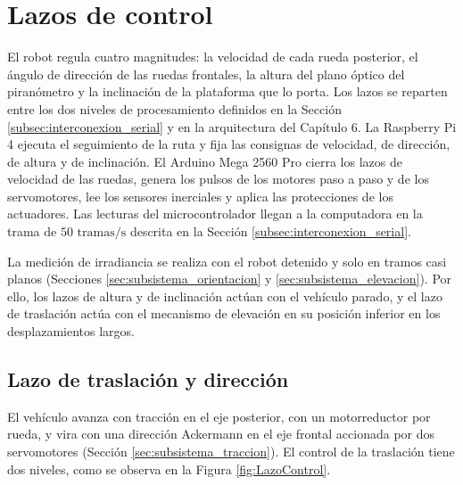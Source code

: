\documentclass[../../General.tex]{subfiles}
\begin{document}

\section{Lazos de control}\label{sec:lazos_control}

El robot regula cuatro magnitudes: la velocidad de cada rueda posterior, el ángulo de dirección de las ruedas frontales, la altura del plano óptico del piranómetro y la inclinación de la plataforma que lo porta. Los lazos se reparten entre los dos niveles de procesamiento definidos en la Sección \ref{subsec:interconexion_serial} y en la arquitectura del Capítulo 6. La Raspberry Pi 4 ejecuta el seguimiento de la ruta y fija las consignas de velocidad, de dirección, de altura y de inclinación. El Arduino Mega 2560 Pro cierra los lazos de velocidad de las ruedas, genera los pulsos de los motores paso a paso y de los servomotores, lee los sensores inerciales y aplica las protecciones de los actuadores. Las lecturas del microcontrolador llegan a la computadora en la trama de $50\text{ tramas/s}$ descrita en la Sección \ref{subsec:interconexion_serial}.

La medición de irradiancia se realiza con el robot detenido y solo en tramos casi planos (Secciones \ref{sec:subsistema_orientacion} y \ref{sec:subsistema_elevacion}). Por ello, los lazos de altura y de inclinación actúan con el vehículo parado, y el lazo de traslación actúa con el mecanismo de elevación en su posición inferior en los desplazamientos largos.


\subsection{Lazo de traslación y dirección}\label{subsec:lazo_traslacion}

El vehículo avanza con tracción en el eje posterior, con un motorreductor por rueda, y vira con una dirección Ackermann en el eje frontal accionada por dos servomotores (Sección \ref{sec:subsistema_traccion}). El control de la traslación tiene dos niveles, como se observa en la Figura \ref{fig:LazoControl}.
\end{document}

